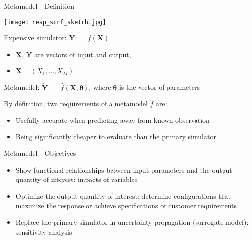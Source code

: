 \documentclass{beamer}
\begin{document}
\begin{frame}[t]{Metamodel - Definition}

\begin{center}
 \texttt{[image: resp\_surf\_sketch.jpg]}
\end{center}

Expensive simulator: $\boldsymbol{Y} \; = \; f(\boldsymbol{X})$
\begin{itemize}
\item $\boldsymbol{X},~\boldsymbol{Y}$ are vectors of input and output,
\item $\boldsymbol{X}=(X_1,\dots,X_M)$
\end{itemize}
   
Metamodel: $ \widetilde{\boldsymbol{Y} } \; = \; \hat{f}(\boldsymbol{X}, \boldsymbol{\theta})$, where $\boldsymbol{\theta}$ is the vector of parameters

By definition, two requirements of a metamodel $\hat{f}$ are:
\begin{itemize}
\item Usefully accurate when predicting away from known observation
\item Being significantly cheaper to evaluate than the primary simulator
\end{itemize}
 

\end{frame}


\begin{frame}[t]{Metamodel - Objectives}

\begin{itemize}
\item Show functional relationships between input parameters and the output quantity of interest: impacts of variables 
\item Optimize the output quantity of interest: determine configurations that maximize the response or achieve specifications or customer requirements
\item Replace the primary simulator in uncertainty propagation (surrogate model):  sensitivity analysis
\end{itemize}

\end{frame}
\end{document}
